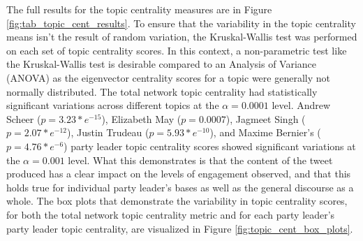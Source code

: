 The full results for the topic centrality measures are in Figure
\ref{fig:tab_topic_cent_results}. To ensure that the variability in the topic
centrality means isn't the result of random variation, the Kruskal-Wallis test
was performed on each set of topic centrality scores. In this context, a
non-parametric test like the Kruskal-Wallis test is desirable compared to an
Analysis of Variance (ANOVA) as the eigenvector centrality scores for a topic
were generally not normally distributed. The total network topic centrality had
statistically significant variations across different topics at the
$\alpha=0.0001$ level. Andrew Scheer ($p=3.23*e^{-15}$), Elizabeth May
($p=0.0007$), Jagmeet Singh ($p=2.07*e^{-12}$), Justin Trudeau
($p=5.93*e^{-10}$), and Maxime Bernier's ($p=4.76*e^{-6}$) party leader topic
centrality scores showed significant variations at the $\alpha=0.001$ level.
What this demonstrates is that the content of the tweet produced has a clear
impact on the levels of engagement observed, and that this holds true for
individual party leader's bases as well as the general discourse as a whole. The
box plots that demonstrate the variability in topic centrality scores, for both
the total network topic centrality metric and for each party leader's party
leader topic centrality, are visualized in Figure \ref{fig:topic_cent_box_plots}.

